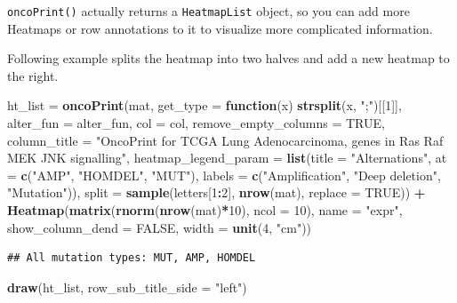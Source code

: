 \documentclass[]{book}
\newenvironment{Shaded}{\begin{snugshade}}{\end{snugshade}}
\newcommand{\KeywordTok}[1]{\textcolor[rgb]{0.13,0.29,0.53}{\textbf{#1}}}
\newcommand{\DataTypeTok}[1]{\textcolor[rgb]{0.13,0.29,0.53}{#1}}
\newcommand{\DecValTok}[1]{\textcolor[rgb]{0.00,0.00,0.81}{#1}}
\newcommand{\StringTok}[1]{\textcolor[rgb]{0.31,0.60,0.02}{#1}}
\newcommand{\OtherTok}[1]{\textcolor[rgb]{0.56,0.35,0.01}{#1}}
\newcommand{\ControlFlowTok}[1]{\textcolor[rgb]{0.13,0.29,0.53}{\textbf{#1}}}
\newcommand{\OperatorTok}[1]{\textcolor[rgb]{0.81,0.36,0.00}{\textbf{#1}}}
\newcommand{\NormalTok}[1]{#1}
\theoremstyle{definition}
\theoremstyle{definition}
\theoremstyle{definition}
\theoremstyle{remark}
\begin{document}
\texttt{oncoPrint()} actually returns a \texttt{HeatmapList} object, so
you can add more Heatmaps or row annotations to it to visualize more
complicated information.

Following example splits the heatmap into two halves and add a new
heatmap to the right.

\begin{Shaded}
\begin{Highlighting}[]
\NormalTok{ht_list =}\StringTok{ }\KeywordTok{oncoPrint}\NormalTok{(mat, }\DataTypeTok{get_type =} \ControlFlowTok{function}\NormalTok{(x) }\KeywordTok{strsplit}\NormalTok{(x, }\StringTok{";"}\NormalTok{)[[}\DecValTok{1}\NormalTok{]],}
    \DataTypeTok{alter_fun =}\NormalTok{ alter_fun, }\DataTypeTok{col =}\NormalTok{ col, }
    \DataTypeTok{remove_empty_columns =} \OtherTok{TRUE}\NormalTok{,}
    \DataTypeTok{column_title =} \StringTok{"OncoPrint for TCGA Lung Adenocarcinoma, genes in Ras Raf MEK JNK signalling"}\NormalTok{,}
    \DataTypeTok{heatmap_legend_param =} \KeywordTok{list}\NormalTok{(}\DataTypeTok{title =} \StringTok{"Alternations"}\NormalTok{, }\DataTypeTok{at =} \KeywordTok{c}\NormalTok{(}\StringTok{"AMP"}\NormalTok{, }\StringTok{"HOMDEL"}\NormalTok{, }\StringTok{"MUT"}\NormalTok{), }
        \DataTypeTok{labels =} \KeywordTok{c}\NormalTok{(}\StringTok{"Amplification"}\NormalTok{, }\StringTok{"Deep deletion"}\NormalTok{, }\StringTok{"Mutation"}\NormalTok{)),}
    \DataTypeTok{split =} \KeywordTok{sample}\NormalTok{(letters[}\DecValTok{1}\OperatorTok{:}\DecValTok{2}\NormalTok{], }\KeywordTok{nrow}\NormalTok{(mat), }\DataTypeTok{replace =} \OtherTok{TRUE}\NormalTok{)) }\OperatorTok{+}
\KeywordTok{Heatmap}\NormalTok{(}\KeywordTok{matrix}\NormalTok{(}\KeywordTok{rnorm}\NormalTok{(}\KeywordTok{nrow}\NormalTok{(mat)}\OperatorTok{*}\DecValTok{10}\NormalTok{), }\DataTypeTok{ncol =} \DecValTok{10}\NormalTok{), }\DataTypeTok{name =} \StringTok{"expr"}\NormalTok{, }\DataTypeTok{show_column_dend =} \OtherTok{FALSE}\NormalTok{, }\DataTypeTok{width =} \KeywordTok{unit}\NormalTok{(}\DecValTok{4}\NormalTok{, }\StringTok{"cm"}\NormalTok{))}
\end{Highlighting}
\end{Shaded}

\begin{verbatim}
## All mutation types: MUT, AMP, HOMDEL
\end{verbatim}

\begin{Shaded}
\begin{Highlighting}[]
\KeywordTok{draw}\NormalTok{(ht_list, }\DataTypeTok{row_sub_title_side =} \StringTok{"left"}\NormalTok{)}
\end{Highlighting}
\end{Shaded}
\end{document}
